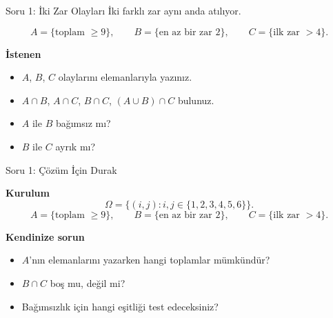 \documentclass[light]{lutbeamer}
\newcommand{\solutionghost}[1]{{\color{red!45!black}#1}}
\begin{document}
\begin{frame}[t]{Soru 1: İki Zar Olayları}
\footnotesize
İki farklı zar aynı anda atılıyor.

\[
A=\{\text{toplam } \ge 9\},\qquad
B=\{\text{en az bir zar }2\},\qquad
C=\{\text{ilk zar }>4\}.
\]

\textbf{İstenen}
\begin{itemize}
  \item[A.] \(A\), \(B\), \(C\) olaylarını elemanlarıyla yazınız.
  \item[B.] \(A\cap B\), \(A\cap C\), \(B\cap C\), \((A\cup B)\cap C\) bulunuz.
  \item[C.] \(A\) ile \(B\) bağımsız mı?
  \item[D.] \(B\) ile \(C\) ayrık mı?
\end{itemize}
\end{frame}

\begin{frame}[t]{Soru 1: Çözüm İçin Durak}
\scriptsize
\solutionghost{
\textbf{Kurulum}
\[
\Omega=\{(i,j): i,j\in\{1,2,3,4,5,6\}\}.
\]
\[
A=\{\text{toplam } \ge 9\},\qquad
B=\{\text{en az bir zar }2\},\qquad
C=\{\text{ilk zar }>4\}.
\]

\textbf{Kendinize sorun}
\begin{itemize}
  \item \(A\)'nın elemanlarını yazarken hangi toplamlar mümkündür?
  \item \(B\cap C\) boş mu, değil mi?
  \item Bağımsızlık için hangi eşitliği test edeceksiniz?
\end{itemize}
}
\end{frame}
\end{document}

